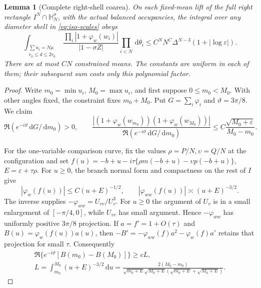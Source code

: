 \documentclass[11pt]{article}
\numberwithin{equation}{section}
\newtheorem{lemma}[theorem]{Lemma}
\theoremstyle{definition}
\newcommand{\dd}{\,\mathrm d}
\newcommand{\eps}{\varepsilon}
\begin{document}
\begin{lemma}[Complete right-shell coarea]\label{lem:iso-coarea}
On each fixed-mean lift of the full right rectangle
$I^N\cap\mathbb H_N^\sigma$, with the actual balanced occupancies,
the integral over any diameter shell in \eqref{eq:iso-scales} obeys
\begin{equation}\label{eq:iso-shell-coarea}
 \int_{\substack{\sum u_i=N\mu\\r_0\le d\le2r_0}}
  \frac{\prod_i|1+\varphi_w(w_i)|}{|1-\sigma Z|}
       \prod_{i<N}\dd\theta_i
 \le C^NN^C\Delta^{N-3}(1+|\log\eps|).
\end{equation}
There are at most $CN$ constrained means.  The constants are uniform
in each of them; their subsequent sum costs only this polynomial
factor.
\end{lemma}
\begin{proof}
Write $m_0=\min u_i$, $M_0=\max u_i$, and first suppose
$0\le m_0<M_0$.  With other angles fixed, the constraint fixes
$m_0+M_0$.  Put $G=\sum_i\varphi_i$ and $\vartheta=3\pi/8$.
We claim
\begin{equation}\label{eq:iso-extreme-ratio}
 \Re(e^{-i\vartheta}\dd G/\dd m_0)>0,\qquad
 \frac{|(1+\varphi_w(w_{m_0}))(1+\varphi_w(w_{M_0}))|}
      {\Re(e^{-i\vartheta}\dd G/\dd m_0)}
 \le C\frac{\sqrt{M_0+\eps}}{M_0-m_0}.
\end{equation}

For the one-variable comparison curve, fix the values
$\rho=P/N,\upsilon=Q/N$ at the configuration and set
$f(u)=-b+u-i\tau\{\rho m(-b+u)-\upsilon p(-b+u)\}$,
$E=\eps+\tau\rho$.  For $u\ge0$, the branch normal form and
compactness on the rest of $I$ give
\[
 |\varphi_w(f(u))|\le C(u+E)^{-1/2},\qquad
 |\varphi_{ww}(f(u))|\asymp(u+E)^{-3/2}.
\]
The inverse supplies
$-\varphi_{ww}=U_{vv}/U_v^3$.  For $u\ge0$ the argument of $U_v$
is in a small enlargement of $[-\pi/4,0]$, while $U_{vv}$ has small
argument.  Hence $-\varphi_{ww}$ has uniformly positive
$3\pi/8$ projection.  If $a=f'=1+O(\tau)$ and
$B(u)=\varphi_w(f(u))a(u)$, then
$-B'=-\varphi_{ww}(f)a^2-\varphi_w(f)a'$ retains that projection
for small $\tau$.  Consequently
\begin{equation}\label{eq:iso-fixed-occupancy-curvature}
 \begin{gathered}
 \Re\{e^{-i\vartheta}[B(m_0)-B(M_0)]\}\ge cL,
 \\
 L=\int_{m_0}^{M_0}(u+E)^{-3/2}\dd u
 =\frac{2(M_0-m_0)}{\sqrt{m_0+E}\sqrt{M_0+E}
                         (\sqrt{m_0+E}+\sqrt{M_0+E})}.
 \end{gathered}
\end{equation}


\end{proof}
\end{document}
